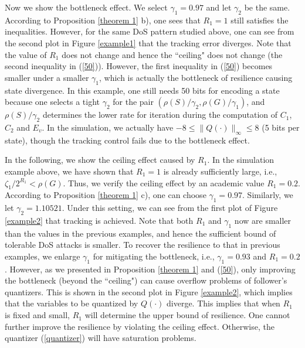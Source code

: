 \documentclass{autart}
\begin{document}
Now we show the bottleneck effect. We select $\gamma_1=0.97$ and let $\gamma_2$ be the same. According to Proposition \ref{theorem 1} b), one sees that $R_1=1$ still satisfies the inequalities. However, for the same DoS pattern studied above, one can see from the second plot in Figure \ref{example1} that the tracking error diverges. 
Note that the value of $R_1$ does not change and hence the ``ceiling" does not change (the second inequality in (\ref{50})). However, the first inequality in (\ref{50}) becomes smaller under a smaller $\gamma_1$, which is actually the bottleneck of resilience causing state divergence. In this example, one still needs 50 bits for encoding a state because one selects a tight $\gamma_2$ for the pair $(\rho(S)/\gamma_2, \rho(G)/\gamma_1)$, and $\rho(S)/\gamma_2$ determines the lower rate for iteration during the computation of $C_1$, $C_2$ and $E_v$. In the simulation, we actually have $-8 \le \|Q (\cdot)\|_\infty \le 8 $ (5 bits per state), though the tracking control fails due to the bottleneck effect.





In the following, we show the ceiling effect caused by $R_1$. 
In the simulation example above, we have shown that $R_1=1$ is already sufficiently large, i.e., $\zeta_1/2^{R_1}< \rho(G)$. Thus, we verify the ceiling effect by an academic value $R_1=0.2$. According to Proposition \ref{theorem 1} c), one can choose $\gamma_1=0.97$. Similarly, we let $\gamma_2=1.10521$. Under this setting, we can see from the first plot of Figure \ref{example2} that tracking is achieved. Note that both $R_1$ and $\gamma_1$ now are smaller than the values in the previous examples, and hence the sufficient bound of tolerable DoS attacks is smaller. To recover the resilience to that in previous examples, we enlarge $\gamma_1$ for mitigating the bottleneck, i.e., $\gamma_1=0.93$ and $R_1=0.2$. However, as we presented in Proposition \ref{theorem 1} and (\ref{50}), only improving the bottleneck (beyond the ``ceiling") can cause overflow problems of follower's quantizers. This is shown in the second plot in Figure \ref{example2}, which implies that the variables to be quantized by $Q(\cdot)$ diverge. This implies that when $R_1$ is fixed and small, $R_1$ will determine the upper bound of resilience. One cannot further improve the resilience by violating the ceiling effect. Otherwise, the quantizer (\ref{quantizer}) will have saturation problems.  
\end{document}
